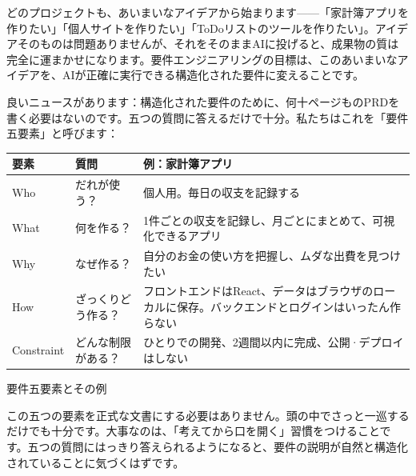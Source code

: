 


どのプロジェクトも、あいまいなアイデアから始まります——「家計簿アプリを作りたい」「個人サイトを作りたい」「ToDoリストのツールを作りたい」。アイデアそのものは問題ありませんが、それをそのままAIに投げると、成果物の質は完全に運まかせになります。要件エンジニアリングの目標は、このあいまいなアイデアを、AIが正確に実行できる構造化された要件に変えることです。

良いニュースがあります：構造化された要件のために、何十ページものPRDを書く必要はないのです。五つの質問に答えるだけで十分。私たちはこれを「要件五要素」と呼びます：

\begin{center}
\begin{tabularx}{\linewidth}{|X|X|X|}
\hline
\textbf{要素} & \textbf{質問} & \textbf{例：家計簿アプリ} \tabularnewline
\hline
Who & だれが使う？ & 個人用。毎日の収支を記録する \tabularnewline
What & 何を作る？ & 1件ごとの収支を記録し、月ごとにまとめて、可視化できるアプリ \tabularnewline
Why & なぜ作る？ & 自分のお金の使い方を把握し、ムダな出費を見つけたい \tabularnewline
How & ざっくりどう作る？ & フロントエンドはReact、データはブラウザのローカルに保存。バックエンドとログインはいったん作らない \tabularnewline
Constraint & どんな制限がある？ & ひとりでの開発、2週間以内に完成、公開·デプロイはしない \tabularnewline
\hline
\end{tabularx}
\end{center}

\begin{center}\small\color{gray}要件五要素とその例\end{center}

この五つの要素を正式な文書にする必要はありません。頭の中でさっと一巡するだけでも十分です。大事なのは、「考えてから口を開く」習慣をつけることです。五つの質問にはっきり答えられるようになると、要件の説明が自然と構造化されていることに気づくはずです。

